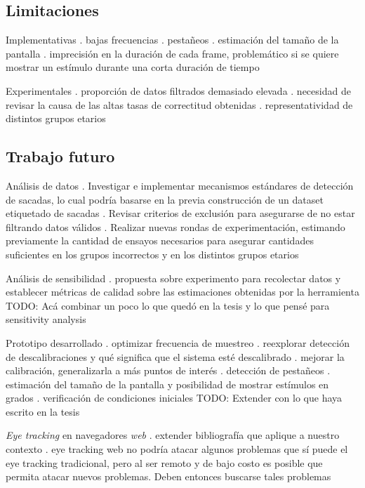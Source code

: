 \documentclass[aspectratio=169]{beamer}
\begin{document}
\subsection{Limitaciones}

\begin{frame}{Implementativas}
. bajas frecuencias
. pestañeos
. estimación del tamaño de la pantalla
. imprecisión en la duración de cada frame, problemático si se quiere mostrar
  un estímulo durante una corta duración de tiempo
\end{frame}

\begin{frame}{Experimentales}
. proporción de datos filtrados demasiado elevada
. necesidad de revisar la causa de las altas tasas de correctitud obtenidas
. representatividad de distintos grupos etarios
\end{frame}

\subsection{Trabajo futuro}

\begin{frame}{Análisis de datos}
. Investigar e implementar mecanismos estándares de detección de sacadas, lo
  cual podría basarse en la previa construcción de un dataset etiquetado de
  sacadas
. Revisar criterios de exclusión para asegurarse de no estar filtrando datos
  válidos
. Realizar nuevas rondas de experimentación, estimando previamente la cantidad
  de ensayos necesarios para asegurar cantidades suficientes en los grupos
  incorrectos y en los distintos grupos etarios
\end{frame}

\begin{frame}{Análisis de sensibilidad}
. propuesta sobre experimento para recolectar datos y establecer métricas de
  calidad sobre las estimaciones obtenidas por la herramienta
TODO: Acá combinar un poco lo que quedó en la tesis y lo que pensé para
      sensitivity analysis
\end{frame}

\begin{frame}{Prototipo desarrollado}
. optimizar frecuencia de muestreo
. reexplorar detección de descalibraciones y qué significa que el sistema esté
  descalibrado
. mejorar la calibración, generalizarla a más puntos de interés
. detección de pestañeos
. estimación del tamaño de la pantalla y posibilidad de mostrar estímulos en
  grados
. verificación de condiciones iniciales
TODO: Extender con lo que haya escrito en la tesis
\end{frame}

\begin{frame}{\textit{Eye tracking} en navegadores \textit{web}}
. extender bibliografía que aplique a nuestro contexto
. eye tracking web no podría atacar algunos problemas que sí puede el eye
  tracking tradicional, pero al ser remoto y de bajo costo es posible que
  permita atacar nuevos problemas. Deben entonces buscarse tales problemas
\end{frame}
\end{document}
